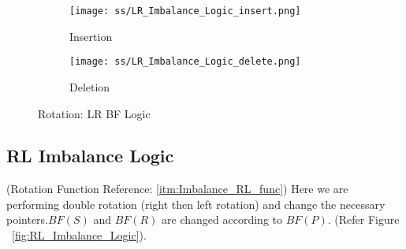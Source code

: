 \documentclass{article}
\begin{document}
    \begin{figure}[H]
        \begin{subfigure}{0.5\textwidth}
            \centering
            \texttt{[image: ss/LR\_Imbalance\_Logic\_insert.png]}
            \caption{Insertion}
        \end{subfigure}
        \begin{subfigure}{0.5\textwidth}
            \centering
            \texttt{[image: ss/LR\_Imbalance\_Logic\_delete.png]}
            \caption{Deletion}
        \end{subfigure}
        \caption{Rotation: LR BF Logic}
    \label{fig:LR_Imbalance_Logic}
    \end{figure}  

\subsection{RL Imbalance Logic}
\label{RL_Imb_op_logic}
(Rotation Function Reference: \ref{itm:Imbalance_RL_func})
Here we are performing double rotation (right then left rotation) and change the necessary pointers.$BF(S)$ and $BF(R)$ are changed according to $BF(P)$. (Refer Figure ~\ref{fig:RL_Imbalance_Logic}). 
\end{document}
